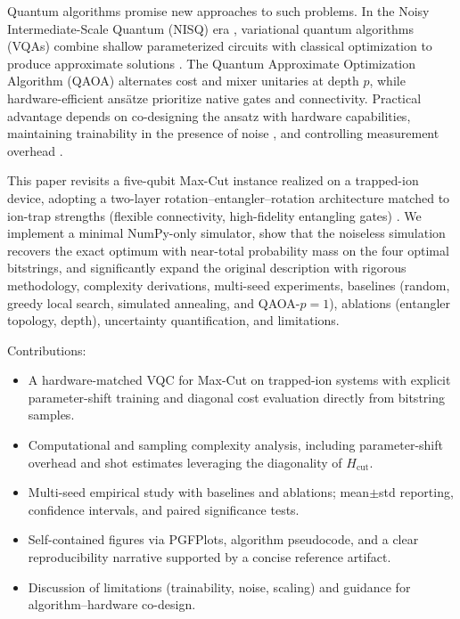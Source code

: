 Quantum algorithms promise new approaches to such problems. In the Noisy Intermediate-Scale Quantum (NISQ) era \cite{preskill2018nisq}, variational quantum algorithms (VQAs) combine shallow parameterized circuits with classical optimization to produce approximate solutions \cite{peruzzo2014vqe,cerezo2021variational,tilly2022vqe}. The Quantum Approximate Optimization Algorithm (QAOA) \cite{farhi2014qaoa} alternates cost and mixer unitaries at depth $p$, while hardware-efficient ans\"atze \cite{kandala2017hardware} prioritize native gates and connectivity. Practical advantage depends on co-designing the ansatz with hardware capabilities, maintaining trainability in the presence of noise \cite{mcclean2018barren,arrasmith2021trainability,wang2021noiseplateaus}, and controlling measurement overhead \cite{huggins2021efficient,verteletskyi2020measurement}.

This paper revisits a five-qubit Max-Cut instance realized on a trapped-ion device, adopting a two-layer rotation--entangler--rotation architecture matched to ion-trap strengths (flexible connectivity, high-fidelity entangling gates) \cite{bruzewicz2019trappedion,pino2021qccd,wright2019benchmarking}. We implement a minimal NumPy-only simulator, show that the noiseless simulation recovers the exact optimum with near-total probability mass on the four optimal bitstrings, and significantly expand the original description with rigorous methodology, complexity derivations, multi-seed experiments, baselines (random, greedy local search, simulated annealing, and QAOA-$p=1$), ablations (entangler topology, depth), uncertainty quantification, and limitations.

Contributions:
\begin{itemize}
    \item A hardware-matched VQC for Max-Cut on trapped-ion systems with explicit parameter-shift training and diagonal cost evaluation directly from bitstring samples.
    \item Computational and sampling complexity analysis, including parameter-shift overhead and shot estimates leveraging the diagonality of $H_{\mathrm{cut}}$.
    \item Multi-seed empirical study with baselines and ablations; mean$\pm$std reporting, confidence intervals, and paired significance tests.
    \item Self-contained figures via PGFPlots, algorithm pseudocode, and a clear reproducibility narrative supported by a concise reference artifact.
    \item Discussion of limitations (trainability, noise, scaling) and guidance for algorithm–hardware co-design.
\end{itemize}

